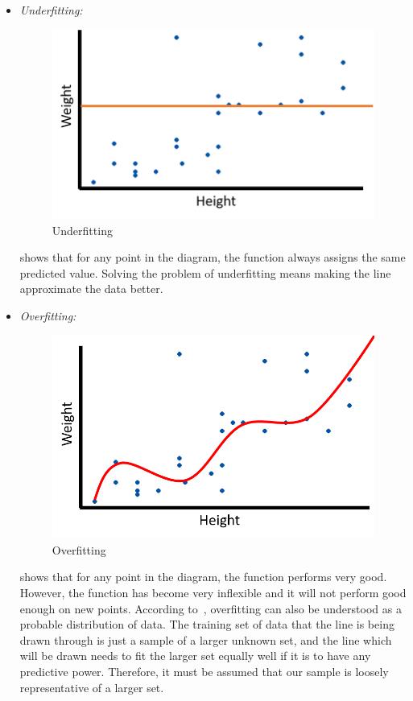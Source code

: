 \begin{itemize}
	\item \textit{Underfitting:}
	\begin{figure}
		\includegraphics[width=\linewidth]{img/underfit.png}
		\caption{Underfitting~\cite{gs}}
		\label{fig:underfit}
	\end{figure}
	 shows that for any point in the diagram, the function always assigns the same predicted value. Solving the problem of underfitting means making the line approximate the data better.
	\item \textit{Overfitting:} 
	\begin{figure}
		\includegraphics[width=\linewidth]{img/overfit.png}
		\caption{Overfitting~\cite{gs}}
		\label{fig:overfit}
	\end{figure}
	 shows that for any point in the diagram, the function performs very good. However, the function has become very inflexible and it will not perform good enough on new points. According to~\cite{tfidf}, overfitting can also be understood as a probable distribution of data. The training set of data that the line is being drawn through is just a sample of a larger unknown set, and the line which will be drawn needs to fit the larger set equally well if it is to have any predictive power. Therefore, it must be assumed that our sample is loosely representative of a larger set.
\end{itemize}
